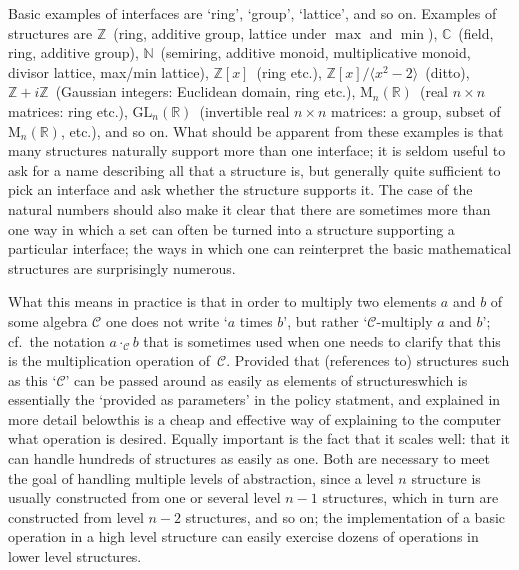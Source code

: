 \documentclass{mtmtcl}
\theoremstyle{plain}
\theoremstyle{remark}
\begin{document}
Basic examples of interfaces are `ring', `group', `lattice', and so 
on. Examples of structures are $\mathbb{Z}$~(ring, additive group, 
lattice under $\max$ and $\min$), $\mathbb{C}$~(field, ring, additive 
group), $\mathbb{N}$~(semiring, additive monoid, multiplicative 
monoid, divisor lattice, max/min lattice), $\mathbb{Z}[x]$~(ring etc.), 
$\mathbb{Z}[x]\big/ \langle x^2 - 2\rangle$~(ditto), $\mathbb{Z} + 
i\mathbb{Z}$~(Gaussian integers: Euclidean domain, ring etc.), 
$\mathrm{M}_n(\mathbb{R})$~(real $n \times n$ matrices: ring etc.), 
$\mathrm{GL}_n(\mathbb{R})$~(invertible real $n \times n$ matrices: a 
group, subset of $\mathrm{M}_n(\mathbb{R})$, etc.), and so on. 
What should be apparent from these examples is 
that many structures naturally support more than one interface; it is 
seldom useful to ask for a name describing all that a structure is, 
but generally quite sufficient to pick an interface and ask whether 
the structure supports it. The case of the natural numbers should 
also make it clear that there are sometimes more than one way in which 
a set can often be turned into a structure supporting a particular 
interface; the ways in which one can reinterpret the basic 
mathematical structures are surprisingly numerous.

What this means in practice is that in order to multiply two 
elements $a$ and $b$ of some algebra $\mathcal{C}$ one does not 
write `$a$ times $b$', but rather `$\mathcal{C}$-multiply $a$ and 
$b$'; cf.~the notation \(a \cdot_{\mathcal{C}} b\) that is 
sometimes used when one needs to clarify that this is the 
multiplication operation of~$\mathcal{C}$. Provided that (references 
to) structures such as this `$\mathcal{C}$' can be passed around as 
easily as elements of structures\Ldash which is essentially the 
`provided as parameters' in the policy statment, and explained in 
more detail below\Rdash this is a cheap and effective way of 
explaining to the computer what operation is desired. Equally 
important is the fact that it scales well: that it can handle 
hundreds of structures as easily as one. Both are necessary to meet 
the goal of handling multiple levels of abstraction, since a level 
$n$ structure is usually constructed from one or several level $n-1$ 
structures, which in turn are constructed from level $n-2$ 
structures, and so on; the implementation of a basic operation in 
a high level structure can easily exercise dozens of operations in 
lower level structures.
\end{document}
